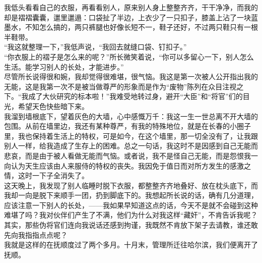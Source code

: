 我低头看看自己的衣服，再看看别人，原来别人身上整整齐齐，干干净净，而我的却是褶褶囊囊，邋里邋遢：口袋扯了半边，上衣少了一只扣子，膝盖上沾了一块蓝墨水，不知怎么搞的，两只裤腿也好像长短不一，鞋子还好，不过两只鞋只有一根半鞋带。\\

“我这就整理一下，”我低声说，“我回去就缝口袋、钉扣子。”\\

“你衣服上的褶子是怎么来的呢？”所长微笑着说，“你可以多留心一下，别人怎么生活。能学习别人的长处，才能进步。”\\

尽管所长说得很和婉，我却觉得很难堪，很气恼。我这是第一次被人公开指出我的无能，这是我第一次不是被当做尊严的形象而是作为“废物”陈列在众目注视之下。“我成了大伙研究的标本啦！”我难受地转过身，避开“大臣”和“将官”们的目光，希望天色快些暗下来。\\

我溜到墙根底下，望着灰色的大墙，心中感慨万千：我这一生一世总离不开大墙的包围。从前在墙里边，我还有某种尊严，有我的特殊地位，就是在长春的小圈子里，我也保持着生活上的特权，可是如今，在这个墙里，那一切全没有了，让我跟别人一样，给我造成了生存上的困难。总之一句话，我这时不是因感到自己无能而悲哀，而是由于被人看做无能而气恼。或者说，我不是怪自己无能，而是怨恨我一向认为天生应该由人来服侍的特权的丧失。我因免于值日而对所方发生的感激之情，这时一下子全消失了。\\

这天晚上，我发现了别人临睡时脱下衣服，都整整齐齐地叠好、放在枕头底下，而我却一向是脱下来顺手一团，扔到脚底下的。我想起所长说的话，确有几分道理，应该注意一下别人的长处，——我如果早知道这点的话，今天不是就不会碰到这种难堪了吗？我对伙伴们产生了不满，他们为什么对我这样“藏奸”，不肯告诉我呢？\\

其实，那些伪将官们连向我说话还感到拘谨，我既然不肯放下架子去请教，谁还敢先向我指指点点呢？\\

我就是这样的在抚顺度过了两个多月。十月末，管理所迁往哈尔滨，我们便离开了抚顺。